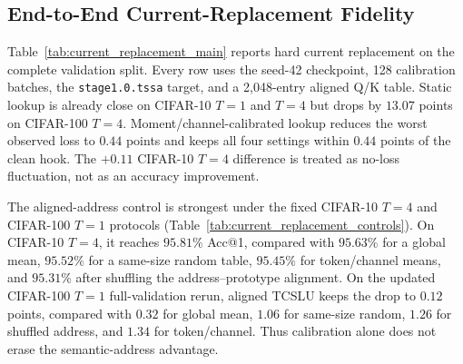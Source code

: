 \subsection{End-to-End Current-Replacement Fidelity}
\label{sec:e3_results}

Table~\ref{tab:current_replacement_main} reports hard current replacement on
the complete validation split. Every row uses the seed-42 checkpoint, 128
calibration batches, the \texttt{stage1.0.tssa} target, and a 2,048-entry
aligned Q/K table. Static lookup is already close on CIFAR-10 $T=1$ and $T=4$
but drops by $13.07$ points on CIFAR-100 $T=4$. Moment/channel-calibrated lookup
reduces the worst observed loss to $0.44$ points and keeps all four settings
within $0.44$ points of the clean hook. The $+0.11$ CIFAR-10 $T=4$ difference
is treated as no-loss fluctuation, not as an accuracy improvement.

\begin{table}[H]
\centering
\footnotesize
{}
\caption{QKFormer end-to-end classification under stage1 current replacement.
Acc@1 and $\Delta$ are percentages/percentage points; $\Delta$ is calibrated
minus clean. ``Calibrated LUT'' is the moment/channel-calibrated aligned Q/K
lookup used by TCSLU. Every row uses 2,048 prototype values (8.0 KiB FP32).
These are local current replacements evaluated end to end, not complete-network
LUT replacements.}
\label{tab:current_replacement_main}
\end{table}

The aligned-address control is strongest under the fixed CIFAR-10 $T=4$ and
CIFAR-100 $T=1$ protocols (Table~\ref{tab:current_replacement_controls}). On
CIFAR-10 $T=4$, it reaches $95.81\%$ Acc@1, compared with $95.63\%$ for a
global mean, $95.52\%$ for a same-size random table, $95.45\%$ for
token/channel means, and $95.31\%$ after shuffling the address--prototype
alignment. On the updated CIFAR-100 $T=1$ full-validation rerun, aligned TCSLU
keeps the drop to $0.12$ points, compared with $0.32$ for global mean, $1.06$
for same-size random, $1.26$ for shuffled address, and $1.34$ for
token/channel. Thus calibration alone does not erase the semantic-address
advantage.

